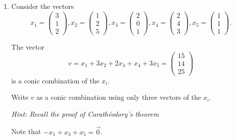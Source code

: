 \documentclass[11pt]{article}
\begin{document}
\begin{enumerate}[1)]
  \item Consider the vectors
$$ x_1 = \left(\begin{array}{c} 3 \\ 1 \\ 2\end{array}\right), x_2 = \left(\begin{array}{c} 1 \\ 2 \\ 5 \end{array}\right), x_3 = \left(\begin{array}{c} 2 \\ 0 \\ 1 \end{array}\right), x_4 = \left(\begin{array}{c}  2 \\ 4 \\ 3 \end{array}\right), x_5 = \left(\begin{array}{c}  1 \\ 1 \\ 1 \end{array}\right). $$

The vector 
$$ v= x_1 + 3 x_2 + 2 x_3 + x_4 + 3 x_5 =  \left(\begin{array}{c}  15\\ 14 \\ 25 \end{array}\right)$$
is a conic combination of the $x_i$.

Write $v$ as a conic combination using only three vectors of the $x_i$.

\emph{Hint: Recall the proof of Carath\'eodory's theorem}




\begin{solution}
Note that $-x_1 + x_3 + x_5 = \vec{0}$. 



\end{solution}
\end{enumerate}
\end{document}
